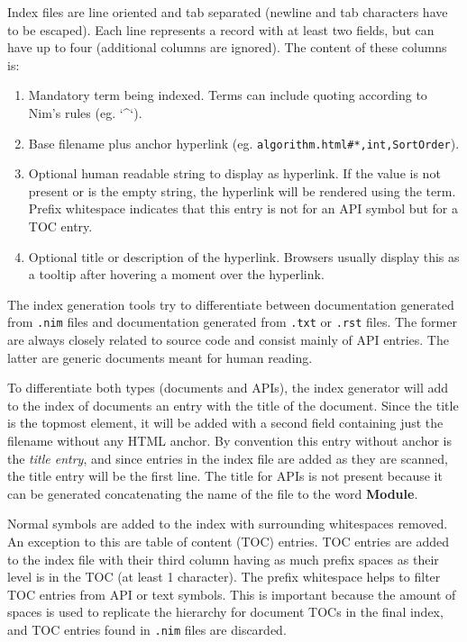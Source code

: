 Index files are line oriented and tab separated (newline and tab
characters have to be escaped). Each line represents a record with at
least two fields, but can have up to four (additional columns are
ignored). The content of these columns is:

\begin{enumerate}
\def\labelenumi{\arabic{enumi}.}
\tightlist
\item
  Mandatory term being indexed. Terms can include quoting according to
  Nim's rules (eg. `\^{}`).
\item
  Base filename plus anchor hyperlink (eg.
  \texttt{algorithm.html\#*,int,SortOrder}).
\item
  Optional human readable string to display as hyperlink. If the value
  is not present or is the empty string, the hyperlink will be rendered
  using the term. Prefix whitespace indicates that this entry is not for
  an API symbol but for a TOC entry.
\item
  Optional title or description of the hyperlink. Browsers usually
  display this as a tooltip after hovering a moment over the hyperlink.
\end{enumerate}

The index generation tools try to differentiate between documentation
generated from \texttt{.nim} files and documentation generated from
\texttt{.txt} or \texttt{.rst} files. The former are always closely
related to source code and consist mainly of API entries. The latter are
generic documents meant for human reading.

To differentiate both types (documents and APIs), the index generator
will add to the index of documents an entry with the title of the
document. Since the title is the topmost element, it will be added with
a second field containing just the filename without any HTML anchor. By
convention this entry without anchor is the \emph{title entry}, and
since entries in the index file are added as they are scanned, the title
entry will be the first line. The title for APIs is not present because
it can be generated concatenating the name of the file to the word
\textbf{Module}.

Normal symbols are added to the index with surrounding whitespaces
removed. An exception to this are table of content (TOC) entries. TOC
entries are added to the index file with their third column having as
much prefix spaces as their level is in the TOC (at least 1 character).
The prefix whitespace helps to filter TOC entries from API or text
symbols. This is important because the amount of spaces is used to
replicate the hierarchy for document TOCs in the final index, and TOC
entries found in \texttt{.nim} files are discarded.

